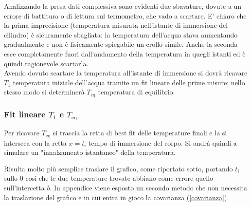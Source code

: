\documentclass{article}
\begin{document}
	Analizzando la presa dati complessiva sono evidenti due sbavature, dovute a un errore di battitura o di lettura sul termometro, che vado a scartare. E' chiaro che la prima imprecisione (temperatura misurata nell'istante di immersione del cilindro) è sicuramente sbagliata: la temperatura dell'acqua stava aumentando gradualmente e non è fisicamente spiegabile un crollo simile. Anche la seconda esce completamente fuori dall'andamento della temperatura in quegli istanti ed è quindi ragionevole scartarla. \\
	
	\noindent
	Avendo dovuto scartare la temperatura all'istante di immersione si dovrà ricavare \(T_{1}\) temperatura iniziale dell'acqua tramite un fit lineare delle prime misure; nello stesso modo si determinerà \(T_{\text{eq}}\) temperatura di equilibrio.
	
	\subsubsection{Fit lineare \(T_{1}\) e \(T_{\text{eq}}\)}
	Per ricavare \(T_{\text{eq}}\) si traccia  la retta di best fit delle temperature finali e la si interseca con la retta \(x=t_{i}\) tempo di immersione del corpo. Si andrà quindi a simulare un "innalzamento istantaneo" della temperatura. 
	
	Risulta molto più semplice traslare il grafico, come riportato sotto, portando \(t_{i}\) sullo \(0\) così che le due temperature trovate abbiano come errore quello sull'intercetta \(b\). In appendice viene esposto un secondo metodo che non necessita la traslazione del grafico e in cui entra in gioco la covarianza (\ref{covarianza}).
	
\end{document}
